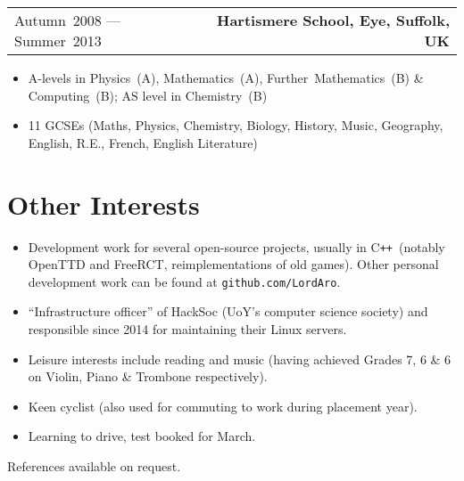 \documentclass[11pt,a4paper]{article}
\newcommand{\cpp}{C{}\texttt{++}}
\newenvironment{myitemize}
{\begin{itemize}[leftmargin=.75in,rightmargin=.75in]
  \itemsep1pt \parskip0pt \parsep0pt}
{\end{itemize}}
\begin{document}
\noindent\begin{tabularx}{\textwidth}{@{}L R@{}}
  Autumn~2008 --- Summer~2013 &
  \textbf{Hartismere School, Eye, Suffolk, UK} \par
\end{tabularx}
\begin{myitemize}
  \item A-levels in Physics~(A), Mathematics~(A), Further~Mathematics~(B)
\& Computing~(B); AS level in Chemistry~(B)
  \item 11 GCSEs (Maths, Physics, Chemistry, %
    Biology, History, %
    Music, Geography, English, %
    R.E., French, English Literature) %
\end{myitemize}

\section{Other Interests}
\begin{myitemize}
  \item Development work for several open-source projects, usually in
    \cpp~(notably OpenTTD and FreeRCT, reimplementations of old games). Other
    personal development work can be found at \texttt{github.com/LordAro}.
  \item ``Infrastructure officer'' of HackSoc (UoY's computer science society)
    and responsible since 2014 for maintaining their Linux servers.
  \item Leisure interests include reading and music (having achieved
    Grades 7, 6 \& 6 on Violin, Piano \& Trombone respectively).
  \item Keen cyclist (also used for commuting to work during placement year).
  \item Learning to drive, test booked for March.
\end{myitemize}

\noindent{}References available on request.
\end{document}
